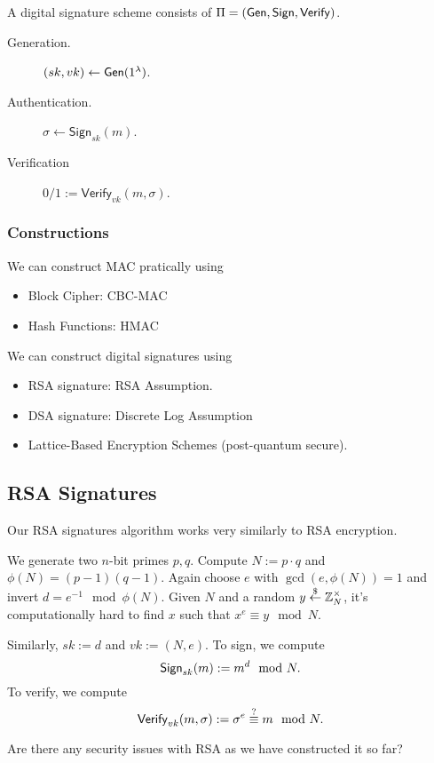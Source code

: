A digital signature scheme consists of $\Pi = (\operatorname{\mathsf{Gen}}, \mathsf{Sign}, \mathsf{Verify})$.
\begin{description}
    \item[Generation.] $(sk, vk)\leftarrow \operatorname{\mathsf{Gen}}(1^\lambda)$.
    \item[Authentication.] $\sigma \leftarrow \mathsf{Sign}_{sk}(m)$.
    \item[Verification] $0/1 := \mathsf{Verify}_{vk}(m, \sigma)$.
\end{description}

\subsubsection{Constructions}
We can construct MAC pratically using
\begin{itemize}
    \item Block Cipher: CBC-MAC
    \item Hash Functions: HMAC
\end{itemize}

We can construct digital signatures using
\begin{itemize}
    \item RSA signature: RSA Assumption.
    \item DSA signature: Discrete Log Assumption
    \item Lattice-Based Encryption Schemes (post-quantum secure).
\end{itemize}

\subsection{RSA Signatures}
Our RSA signatures algorithm works very similarly to RSA encryption.

We generate two $n$-bit primes $p, q$. Compute $N:=p\cdot q$ and $\phi(N) = (p-1)(q-1)$. Again choose $e$ with $\gcd(e, \phi(N)) = 1$ and invert $d = e^{-1}\mod\phi(N)$. Given $N$ and a random $y\overset{\$}{\leftarrow}\mathbb Z_N^\times$, it's computationally hard to find $x$ such that $x^e\equiv y\mod N$.

Similarly, $sk := d$ and $vk := (N, e)$. To sign, we compute
\[\operatorname{\mathsf{Sign}}_{sk}(m) := m^d\mod{N}.\]
To verify, we compute
\[\operatorname{\mathsf{Verify}}_{vk}(m, \sigma):= \sigma^e\overset{?}{\equiv}m\mod N.\]

\begin{ques*}
    Are there any security issues with RSA as we have constructed it so far?
\end{ques*}

